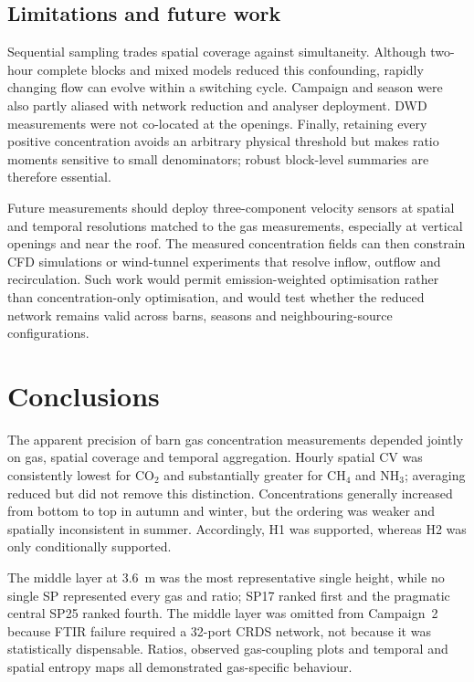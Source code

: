 ﻿\documentclass[12pt,a4paper]{article}
\begin{document}
\subsection{Limitations and future work}
Sequential sampling trades spatial coverage against simultaneity. Although two-hour complete blocks and mixed models reduced this confounding, rapidly changing flow can evolve within a switching cycle. Campaign and season were also partly aliased with network reduction and analyser deployment. DWD measurements were not co-located at the openings. Finally, retaining every positive concentration avoids an arbitrary physical threshold but makes ratio moments sensitive to small denominators; robust block-level summaries are therefore essential.

Future measurements should deploy three-component velocity sensors at spatial and temporal resolutions matched to the gas measurements, especially at vertical openings and near the roof. The measured concentration fields can then constrain CFD simulations or wind-tunnel experiments that resolve inflow, outflow and recirculation. Such work would permit emission-weighted optimisation rather than concentration-only optimisation, and would test whether the reduced network remains valid across barns, seasons and neighbouring-source configurations.

\section{Conclusions}
The apparent precision of barn gas concentration measurements depended jointly on gas, spatial coverage and temporal aggregation. Hourly spatial CV was consistently lowest for \(\mathrm{CO_2}\) and substantially greater for \(\mathrm{CH_4}\) and \(\mathrm{NH_3}\); averaging reduced but did not remove this distinction. Concentrations generally increased from bottom to top in autumn and winter, but the ordering was weaker and spatially inconsistent in summer. Accordingly, H1 was supported, whereas H2 was only conditionally supported.

The middle layer at \SI{3.6}{m} was the most representative single height, while no single SP represented every gas and ratio; SP17 ranked first and the pragmatic central SP25 ranked fourth. The middle layer was omitted from Campaign~2 because FTIR failure required a 32-port CRDS network, not because it was statistically dispensable. Ratios, observed gas-coupling plots and temporal and spatial entropy maps all demonstrated gas-specific behaviour.
\end{document}
